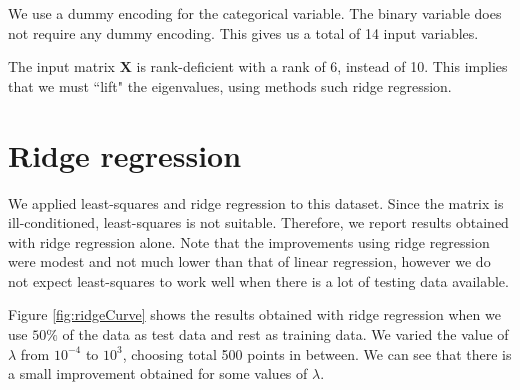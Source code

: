 \documentclass{article} %
\begin{document}
We use a dummy encoding for the categorical variable. The binary variable does not require any dummy encoding. This gives us a total of 14 input variables.

The input matrix $\mathbf{X}$ is rank-deficient with a rank of 6, instead of 10. This implies that we must ``lift" the eigenvalues, using methods such ridge regression.

\begin{figure}[!t]
\center
{}
\hfill
{}
\caption{}
\end{figure}

\section{Ridge regression}
We applied least-squares and ridge regression to this dataset. Since the matrix is ill-conditioned, least-squares is not suitable. Therefore, we report results obtained with ridge regression alone. Note that the improvements using ridge regression were modest and not much lower than that of linear regression, however we do not expect least-squares to work well when there is a lot of testing data available. 

Figure \ref{fig:ridgeCurve} shows the results obtained with ridge regression when we use $50\%$ of the data as test data and rest as training data. We varied the value of $\lambda$ from $10^{-4}$ to $10^3$, choosing total 500 points in between. We can see that there is a small improvement obtained for some values of $\lambda$.
\end{document}
